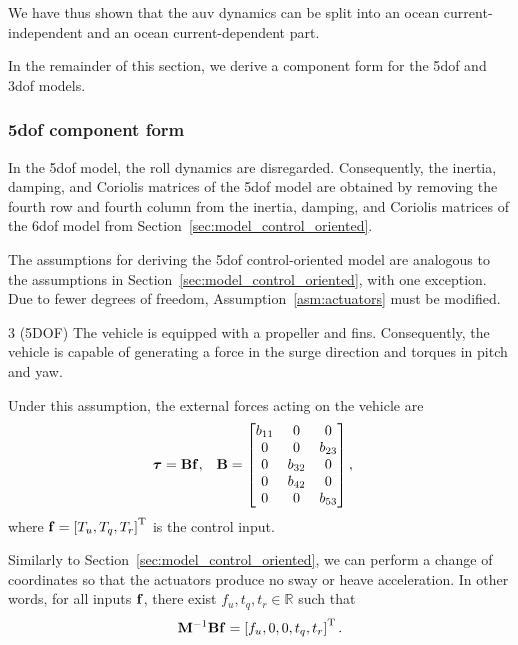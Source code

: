 We have thus shown that the \gls{auv} dynamics can be split into an ocean current-independent and an ocean current-dependent part.

In the remainder of this section, we derive a component form for the 5\gls{dof} and 3\gls{dof} models.

\subsubsection{5\gls{dof} component form}
In the 5\gls{dof} model, the roll dynamics are disregarded.
Consequently, the inertia, damping, and Coriolis matrices of the 5\gls{dof} model are obtained by removing the fourth row and fourth column from the inertia, damping, and Coriolis matrices of the 6\gls{dof} model from Section~\ref{sec:model_control_oriented}.

The assumptions for deriving the 5\gls{dof} control-oriented model are analogous to the assumptions in Section~\ref{sec:model_control_oriented}, with one exception.
Due to fewer degrees of freedom, Assumption~\ref{asm:actuators} must be modified.

\begin{customasm}{3 (5DOF)}
    \label{asm:actuators_5DOF}
    The vehicle is equipped with a propeller and fins.
    Consequently, the vehicle is capable of generating a force in the surge direction and torques in pitch and yaw.
\end{customasm}
Under this assumption, the external forces acting on the vehicle are
\begin{align}
    \bm{\tau} &= \mathbf{B}\mathbf{f}, &
    \mathbf{B} &= 
    \begin{bmatrix}
        b_{11} & 0 & 0 \\ 0 & 0 & b_{23} \\ 0 & b_{32} & 0 \\ 0 & b_{42} & 0 \\ 0 & 0 & b_{53}
    \end{bmatrix},
\end{align}
where $\mathbf{f} = \left[T_u, T_q, T_r\right]^{\mathrm{T}}$ is the control input.

Similarly to Section~\ref{sec:model_control_oriented}, we can perform a change of coordinates so that the actuators produce no sway or heave acceleration.
In other words, for all inputs $\mathbf{f}$, there exist $f_u, t_q, t_r \in \mathbb{R}$ such that
\begin{equation}
    \mathbf{M}^{-1}\mathbf{B}\mathbf{f} = \left[f_u, 0, 0, t_q, t_r\right]^{\mathrm{T}}.
\end{equation}

